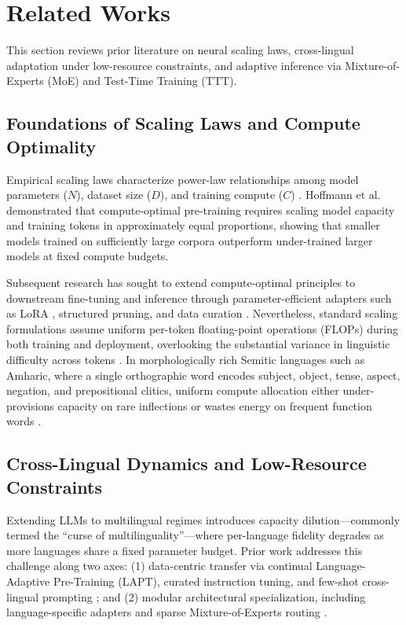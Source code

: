 \documentclass{interact}
\begin{document}
\section{Related Works}
\label{sec:related_works}

This section reviews prior literature on neural scaling laws, cross-lingual adaptation under low-resource constraints, and adaptive inference via Mixture-of-Experts (MoE) and Test-Time Training (TTT).

\subsection{Foundations of Scaling Laws and Compute Optimality}

Empirical scaling laws characterize power-law relationships among model parameters ($N$), dataset size ($D$), and training compute ($C$) \cite{ref1,ref2,ref3,ref4}. Hoffmann et al.\ \cite{ref9} demonstrated that compute-optimal pre-training requires scaling model capacity and training tokens in approximately equal proportions, showing that smaller models trained on sufficiently large corpora outperform under-trained larger models at fixed compute budgets.

Subsequent research has sought to extend compute-optimal principles to downstream fine-tuning and inference through parameter-efficient adapters such as LoRA \cite{ref59}, structured pruning, and data curation \cite{ref13}. Nevertheless, standard scaling formulations assume uniform per-token floating-point operations (FLOPs) during both training and deployment, overlooking the substantial variance in linguistic difficulty across tokens \cite{ref14,ref15}. In morphologically rich Semitic languages such as Amharic, where a single orthographic word encodes subject, object, tense, aspect, negation, and prepositional clitics, uniform compute allocation either under-provisions capacity on rare inflections or wastes energy on frequent function words \cite{ref15}.

\subsection{Cross-Lingual Dynamics and Low-Resource Constraints}

Extending LLMs to multilingual regimes introduces capacity dilution—commonly termed the ``curse of multilinguality''—where per-language fidelity degrades as more languages share a fixed parameter budget. Prior work addresses this challenge along two axes: (1) data-centric transfer via continual Language-Adaptive Pre-Training (LAPT), curated instruction tuning, and few-shot cross-lingual prompting \cite{ref24,ref25}; and (2) modular architectural specialization, including language-specific adapters and sparse Mixture-of-Experts routing \cite{ref7,ref20}.
\end{document}
